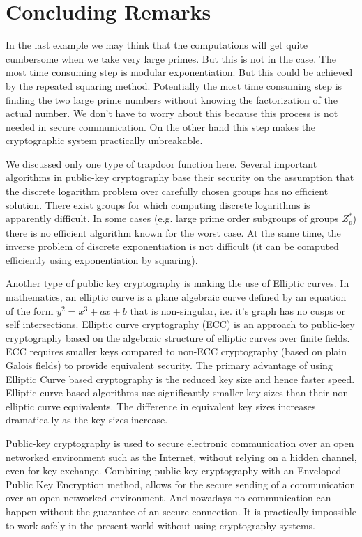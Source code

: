 \documentclass[12pt]{article}
\begin{document}
\section{Concluding Remarks}
In the last example we may think that the computations will get
quite cumbersome when we take very large primes. But this is not in
the case. The most time consuming step is modular exponentiation.
But this could be achieved by the repeated squaring method.
Potentially the most time consuming  step is finding the two large
prime numbers without knowing the factorization of the actual
number. We don't have to worry about this because this process is
not needed in secure communication. On the other hand this step
makes the cryptographic system practically unbreakable.

We discussed only one type of trapdoor function here. Several
important algorithms in public-key cryptography base their security
on the assumption that the discrete logarithm problem over carefully
chosen groups has no efficient solution. There exist groups for
which computing discrete logarithms is apparently difficult. In some
cases (e.g. large prime order subgroups of groups $Z_p^*$) there is
no efficient algorithm known for the worst case. At the same time,
the inverse problem of discrete exponentiation is not difficult (it
can be computed efficiently using exponentiation by squaring).

Another type of public key cryptography is making the use of Elliptic curves. In mathematics, an elliptic curve is a plane algebraic curve defined by an equation of the form $y^2 =x^3 +ax+b$ that is non-singular, i.e. it's graph has no cusps or self intersections. Elliptic curve cryptography (ECC) is an approach to public-key cryptography based on the algebraic structure of elliptic curves over finite fields. ECC requires smaller keys compared to non-ECC cryptography (based on plain Galois fields) to provide equivalent security. The primary advantage of using Elliptic Curve based cryptography is the reduced key size and hence faster speed. Elliptic curve based algorithms use significantly smaller key sizes than their non elliptic curve equivalents. The difference in equivalent key sizes increases dramatically as the key sizes increase.

Public-key cryptography is used to secure electronic communication over an open networked environment such as the Internet, without relying on a hidden channel, even for key exchange. Combining public-key cryptography with an Enveloped Public Key Encryption method, allows for the secure sending of a communication over an open networked environment. And nowadays no communication can happen without the guarantee of an secure connection. It is practically impossible to work safely in the present world without using cryptography systems.
\end{document}
